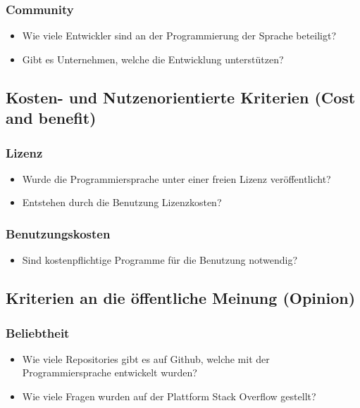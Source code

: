 \subsubsection{Community}
\begin{itemize}
	\item Wie viele Entwickler sind an der Programmierung der Sprache beteiligt?
	\item Gibt es Unternehmen, welche die Entwicklung unterstützen?
\end{itemize}

\subsection{Kosten- und Nutzenorientierte Kriterien (Cost and benefit)}\label{sec:costCriteria}
\subsubsection{Lizenz}
\begin{itemize}
	\item Wurde die Programmiersprache unter einer freien Lizenz veröffentlicht?
	\item Entstehen durch die Benutzung Lizenzkosten?
\end{itemize}

\subsubsection{Benutzungskosten}
\begin{itemize}
	\item Sind kostenpflichtige Programme für die Benutzung notwendig?
\end{itemize}

\subsection{Kriterien an die öffentliche Meinung (Opinion)}\label{sec:opinionCriteria}
\subsubsection{Beliebtheit}
\begin{itemize}
	\item Wie viele Repositories gibt es auf Github, welche mit der Programmiersprache entwickelt wurden?
	\item Wie viele Fragen wurden auf der Plattform Stack Overflow gestellt?
\end{itemize}

